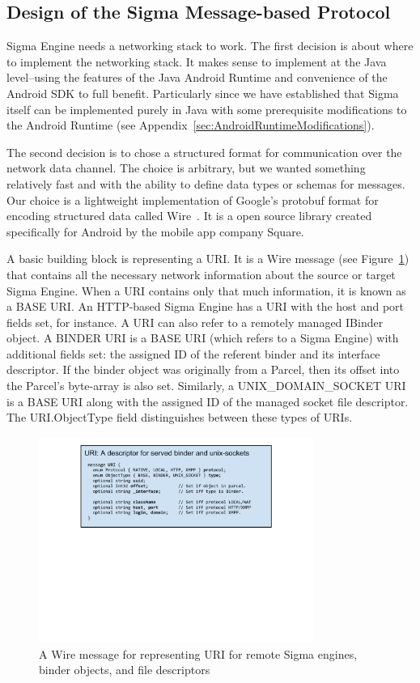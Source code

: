 \documentclass[prodmode]{acmlarge}
\begin{document}
\subsection{Design of the Sigma Message-based Protocol}
Sigma Engine needs a networking stack to work. The first decision is about where to implement the networking stack. It makes sense to implement at the Java level--using the features of the Java Android Runtime and convenience of the Android SDK to full benefit. Particularly since we have established that Sigma itself can be implemented purely in Java with some prerequisite modifications to the Android Runtime (see Appendix~\ref{sec:AndroidRuntimeModifications}).

The second decision is to chose a structured format for communication over the network data channel. The choice is arbitrary, but we wanted something relatively fast and with the ability to define data types or schemas for messages. Our choice is a lightweight implementation of Google's protobuf format for encoding structured data called Wire~\cite{Wire,IntroWire}. It is a open source library created specifically for Android by the mobile app company Square.

A basic building block is representing a URI. It is a Wire message (see Figure~\ref{fig:WireURI}) that contains all the necessary network information about the source or target Sigma Engine. When a URI contains only that much information, it is known as a BASE URI. An HTTP-based Sigma Engine has a URI with the host and port fields set, for instance. A URI can also refer to a remotely managed IBinder object. A BINDER URI is a BASE URI (which refers to a Sigma Engine) with additional fields set: the assigned ID of the referent binder and its interface descriptor. If the binder object was originally from a Parcel, then its offset into the Parcel's byte-array is also set. Similarly, a UNIX\_DOMAIN\_SOCKET URI is a BASE URI along with the assigned ID of the managed socket file descriptor. The URI.ObjectType field distinguishes between these types of URIs.

\begin{figure}[h!]
\centering
\includegraphics[width=0.8\textwidth]{drawings/WireURI.pdf}
\caption{A Wire message for representing URI for remote Sigma engines, binder objects, and file descriptors}
\label{fig:WireURI}
\end{figure}
\end{document}
